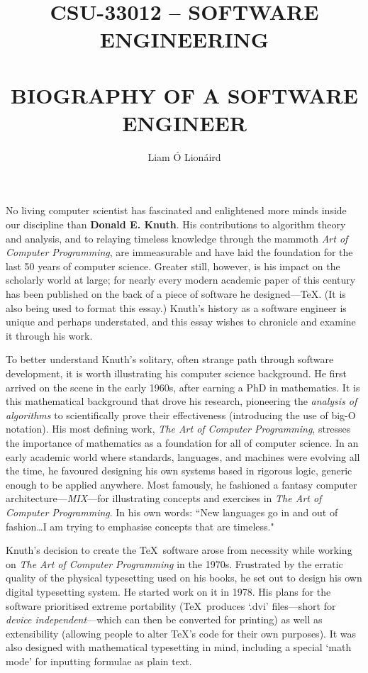 \documentclass[12pt]{article}
\begin{document}
	\title{\textbf{{\Large CSU-33012 -- SOFTWARE ENGINEERING} \\ \\ \large{BIOGRAPHY OF A SOFTWARE ENGINEER}}}
	\author{Liam \'{O} Lion\'{a}ird \qquad [19335530]}
	
	\maketitle
	
	No living computer scientist has fascinated and enlightened more minds inside our discipline than \textbf{Donald E. Knuth}. His contributions to algorithm theory and analysis, and to relaying timeless knowledge through the mammoth \textit{Art of Computer Programming}, are immeasurable and have laid the foundation for the last 50 years of computer science. Greater still, however, is his impact on the scholarly world at large; for nearly every modern academic paper of this century has been published on the back of a piece of software he designed---\TeX. (It is also being used to format this essay.) Knuth's history as a software engineer is unique and perhaps understated, and this essay wishes to chronicle and examine it through his work.
	
	To better understand Knuth's solitary, often strange path through software development, it is worth illustrating his computer science background. He first arrived on the scene in the early 1960s, after earning a PhD in mathematics. It is this mathematical background that drove his research, pioneering the \textit{analysis of algorithms} to scientifically prove their effectiveness (introducing the use of big-O notation). His most defining work, \textit{The Art of Computer Programming}, stresses the importance of mathematics as a foundation for all of computer science. In an early academic world where standards, languages, and machines were evolving all the time, he favoured designing his own systems based in rigorous logic, generic enough to be applied anywhere. Most famously, he fashioned a fantasy computer architecture---\textsl{MIX}---for illustrating concepts and exercises in \textit{The Art of Computer Programming}. In his own words: ``New languages go in and out of fashion\dots I am trying to emphasise concepts that are timeless."
	
	Knuth's decision to create the \TeX\ software arose from necessity while working on \textit{The Art of Computer Programming} in the 1970s. Frustrated by the erratic quality of the physical typesetting used on his books, he set out to design his own digital typesetting system. He started work on it in 1978. His plans for the software prioritised extreme portability (\TeX\ produces `.dvi' files---short for \textit{device independent}---which can then be converted for printing) as well as extensibility (allowing people to alter \TeX's code for their own purposes). It was also designed with mathematical typesetting in mind, including a special `math mode' for inputting formulae as plain text.
	
\end{document}
